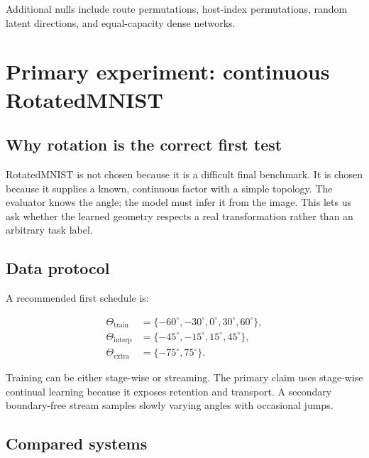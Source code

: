 \documentclass[11pt,a4paper]{article}
\begin{document}
Additional nulls include route permutations, host-index permutations, random latent directions, and equal-capacity dense networks.

\section{Primary experiment: continuous RotatedMNIST}

\subsection{Why rotation is the correct first test}

RotatedMNIST is not chosen because it is a difficult final benchmark. It is chosen because it supplies a known, continuous factor with a simple topology. The evaluator knows the angle; the model must infer it from the image. This lets us ask whether the learned geometry respects a real transformation rather than an arbitrary task label.

\subsection{Data protocol}

A recommended first schedule is:

\begin{align}
\Theta_{\mathrm{train}}&=\{-60^\circ,-30^\circ,0^\circ,30^\circ,60^\circ\},\\
\Theta_{\mathrm{interp}}&=\{-45^\circ,-15^\circ,15^\circ,45^\circ\},\\
\Theta_{\mathrm{extra}}&=\{-75^\circ,75^\circ\}.
\end{align}

Training can be either stage-wise or streaming. The primary claim uses stage-wise continual learning because it exposes retention and transport. A secondary boundary-free stream samples slowly varying angles with occasional jumps.

\subsection{Compared systems}
\end{document}
